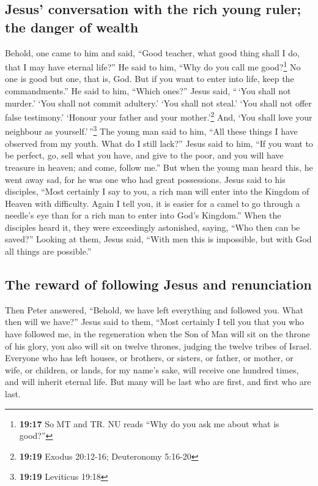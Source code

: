 \hypertarget{jesus-conversation-with-the-rich-young-ruler-the-danger-of-wealth}{%
\subsection{Jesus' conversation with the rich young ruler; the danger of
wealth}\label{jesus-conversation-with-the-rich-young-ruler-the-danger-of-wealth}}

 Behold, one came to him and said, ``Good teacher, what
good thing shall I do, that I may have eternal life?'' 
He said to him, ``Why do you call me good?\footnote{\textbf{19:17} So MT
  and TR. NU reads ``Why do you ask me about what is good?''} No one is
good but one, that is, God. But if you want to enter into life, keep the
commandments.''  He said to him, ``Which ones?'' Jesus
said, ``\,`You shall not murder.' `You shall not commit adultery.' `You
shall not steal.' `You shall not offer false testimony.' 
`Honour your father and your mother.'\footnote{\textbf{19:19} Exodus
  20:12-16; Deuteronomy 5:16-20} And, `You shall love your neighbour as
yourself.'\,''\footnote{\textbf{19:19} Leviticus 19:18} 
The young man said to him, ``All these things I have observed from my
youth. What do I still lack?''  Jesus said to him, ``If
you want to be perfect, go, sell what you have, and give to the poor,
and you will have treasure in heaven; and come, follow me.''
 But when the young man heard this, he went away sad, for
he was one who had great possessions.  Jesus said to his
disciples, ``Most certainly I say to you, a rich man will enter into the
Kingdom of Heaven with difficulty.  Again I tell you, it
is easier for a camel to go through a needle's eye than for a rich man
to enter into God's Kingdom.''  When the disciples heard
it, they were exceedingly astonished, saying, ``Who then can be saved?''
 Looking at them, Jesus said, ``With men this is
impossible, but with God all things are possible.''

\hypertarget{the-reward-of-following-jesus-and-renunciation}{%
\subsection{The reward of following Jesus and
renunciation}\label{the-reward-of-following-jesus-and-renunciation}}

 Then Peter answered, ``Behold, we have left everything
and followed you. What then will we have?''  Jesus said
to them, ``Most certainly I tell you that you who have followed me, in
the regeneration when the Son of Man will sit on the throne of his
glory, you also will sit on twelve thrones, judging the twelve tribes of
Israel.  Everyone who has left houses, or brothers, or
sisters, or father, or mother, or wife, or children, or lands, for my
name's sake, will receive one hundred times, and will inherit eternal
life.  But many will be last who are first, and first who
are last.


